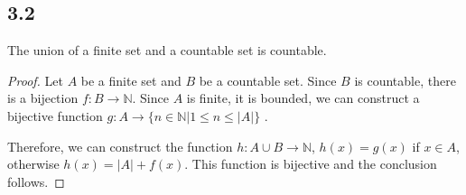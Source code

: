 \subsection*{3.2}
The union of a finite set and a countable set is countable.
\begin{proof}
Let $A$ be a finite set and $B$ be a countable set. Since $B$ is countable, there is a bijection $f:B  \rightarrow \mathbb{N}$. Since $A$ is finite, it is bounded, we can construct a bijective function $g: A \rightarrow \{n \in \mathbb{N}| 1 \leq n \leq |A|\}$ .

Therefore, we can construct the function $h:A \cup B \rightarrow \mathbb{N}$, $h(x) = g(x)$ if $x \in A$, otherwise $h(x) = |A|+f(x)$. This function is bijective and the conclusion follows.
\end{proof}

